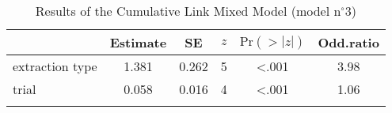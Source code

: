 \begin{table}
\begin{tabular}{l S[table-format=1.3] S[table-format=1.3] S[table-format=1] S[table-format=<1.3] S[table-format=1.2]}
  \lsptoprule
 & {Estimate} & {SE} & {$z$} & {$\text{Pr}(>|z|)$} & {Odd.ratio} \\ 
  \midrule
  extraction type & 1.381 & 0.262 & 5 & <.001 & 3.98 \\ 
  trial & 0.058 & 0.016 & 4 & <.001 & 1.06 \\ 
   \lspbottomrule
\end{tabular}
\caption{Results of the Cumulative Link Mixed Model (model n$^{\circ}$3)}
\label{tab:exp07-m3}
\end{table}
